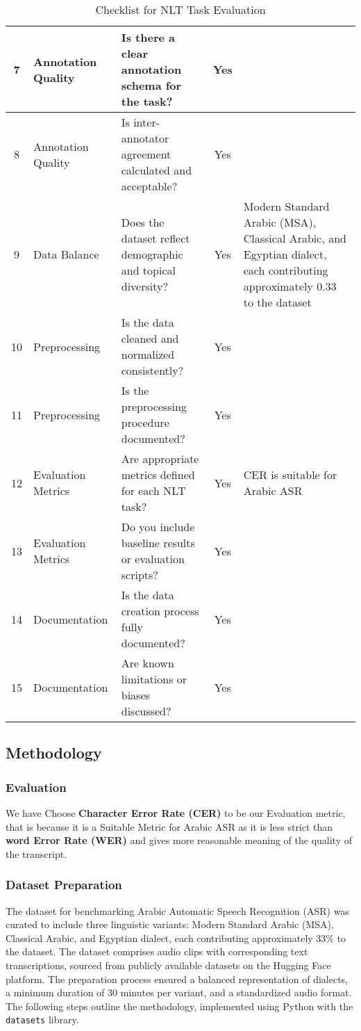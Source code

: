 \documentclass[12pt]{article}
\begin{document}
\begin{table}[H]
{\begin{tabular}{|c|p{3cm}|p{6cm}|c|p{4cm}|}
7 & Annotation Quality & Is there a clear annotation schema for the task? & Yes & \\ \hline


8 & Annotation Quality & Is inter-annotator agreement calculated and acceptable? & Yes & \\ \hline


9 & Data Balance & Does the dataset reflect demographic and topical diversity? & Yes & Modern Standard Arabic (MSA), Classical Arabic, and Egyptian dialect, each contributing approximately 0.33 to the dataset \\ \hline
10 & Preprocessing & Is the data cleaned and normalized consistently? & Yes & \\ \hline
11 & Preprocessing & Is the preprocessing procedure documented? & Yes & \\ \hline
12 & Evaluation Metrics & Are appropriate metrics defined for each NLT task? & Yes & CER is suitable for Arabic ASR \\ \hline
13 & Evaluation Metrics & Do you include baseline results or evaluation scripts? & Yes & \\ \hline
14 & Documentation & Is the data creation process fully documented? & Yes & \\ \hline
15 & Documentation & Are known limitations or biases discussed? & Yes & \\ \hline
\end{tabular}%
}
\caption{Checklist for NLT Task Evaluation}
\label{tab:checklist}
\end{table}

\subsection{Methodology}

\subsubsection{Evaluation}
We have Choose \textbf{Character Error Rate (CER)} to be our Evaluation metric, that is because it is a Suitable Metric for Arabic ASR as it is less strict than \textbf{word Error Rate (WER)} and gives more reasonable meaning of the quality of the transcript.

\subsubsection{Dataset Preparation}

The dataset for benchmarking Arabic Automatic Speech Recognition (ASR) was curated to include three linguistic variants: Modern Standard Arabic (MSA), Classical Arabic, and Egyptian dialect, each contributing approximately 33\% to the dataset. The dataset comprises audio clips with corresponding text transcriptions, sourced from publicly available datasets on the Hugging Face platform. The preparation process ensured a balanced representation of dialects, a minimum duration of 30 minutes per variant, and a standardized audio format. The following steps outline the methodology, implemented using Python with the \texttt{datasets} library.
\end{document}
